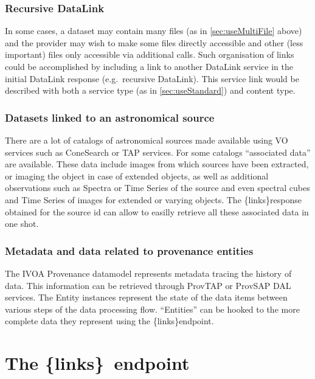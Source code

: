 \documentclass[11pt,a4paper]{ivoa}
\newcommand{\blinks}{\{links\}}
\begin{document}
\subsubsection{Recursive DataLink}

In some cases, a dataset may contain many files
(as in \ref{sec:useMultiFile} above)
and the provider may wish to make some files directly accessible and
other (less important) files only accessible via additional calls. Such
organisation of links could be accomplished by including a link to
another DataLink service in the initial DataLink response (e.g.\ recursive
DataLink). This service link would be described with both a service type
(as in \ref{sec:useStandard}) and content type.


\subsubsection{Datasets linked to an astronomical source}

There are  a lot of catalogs of astronomical sources made available using VO services such as ConeSearch \citep{2008ivoa.specQ0222P} or TAP services. For some catalogs “associated data” are available. These data include images from which sources have been extracted, or imaging the object in  case of extended objects, as well as additional observations such as Spectra or Time Series of the source and even spectral cubes and Time Series of images for extended or varying objects. The \blinks  response obtained for the source id can allow to easilly retrieve all these associated data in one shot.

\subsubsection{Metadata and data related to provenance entities}



The IVOA Provenance datamodel \citep{pr:provdm} represents metadata tracing  the history of data. This information can be retrieved through ProvTAP \citep{iwd:provtap} or ProvSAP \citep{iwd:provsap}  DAL services.  The Entity instances represent  the state of the data items between various steps of the data processing flow. “Entities” can be hooked to the more complete data they represent using the \blinks endpoint.

\section{The \blinks~endpoint}
\end{document}

